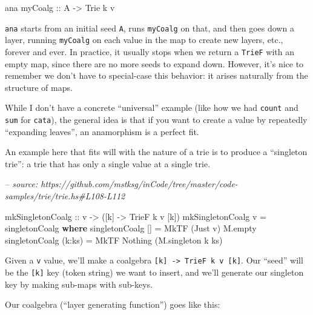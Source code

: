 \documentclass[]{article}
\newenvironment{Shaded}{}{}
\newcommand{\CommentTok}[1]{\textcolor[rgb]{0.38,0.63,0.69}{\textit{#1}}}
\newcommand{\DataTypeTok}[1]{\textcolor[rgb]{0.56,0.13,0.00}{#1}}
\newcommand{\FunctionTok}[1]{\textcolor[rgb]{0.02,0.16,0.49}{#1}}
\newcommand{\KeywordTok}[1]{\textcolor[rgb]{0.00,0.44,0.13}{\textbf{#1}}}
\newcommand{\NormalTok}[1]{#1}
\newcommand{\OtherTok}[1]{\textcolor[rgb]{0.00,0.44,0.13}{#1}}
\begin{document}
\begin{Shaded}
\begin{Highlighting}[]
\NormalTok{ana}\OtherTok{ myCoalg ::} \DataTypeTok{A} \OtherTok{->} \DataTypeTok{Trie}\NormalTok{ k v}
\end{Highlighting}
\end{Shaded}

\texttt{ana} starts from an initial seed \texttt{A}, runs \texttt{myCoalg} on
that, and then goes down a layer, running \texttt{myCoalg} on each value in the
map to create new layers, etc., forever and ever. In practice, it usually stops
when we return a \texttt{TrieF} with an empty map, since there are no more seeds
to expand down. However, it's nice to remember we don't have to special-case
this behavior: it arises naturally from the structure of maps.

While I don't have a concrete ``universal'' example (like how we had
\texttt{count} and \texttt{sum} for \texttt{cata}), the general idea is that if
you want to create a value by repeatedly ``expanding leaves'', an anamorphism is
a perfect fit.

An example here that fits will with the nature of a trie is to produce a
``singleton trie'': a trie that has only a single value at a single trie.

\begin{Shaded}
\begin{Highlighting}[]
\CommentTok{-- source: https://github.com/mstksg/inCode/tree/master/code-samples/trie/trie.hs#L108-L112}

\OtherTok{mkSingletonCoalg ::}\NormalTok{ v }\OtherTok{->}\NormalTok{ ([k] }\OtherTok{->} \DataTypeTok{TrieF}\NormalTok{ k v [k])}
\NormalTok{mkSingletonCoalg v }\FunctionTok{=}\NormalTok{ singletonCoalg}
  \KeywordTok{where}
\NormalTok{    singletonCoalg []     }\FunctionTok{=} \DataTypeTok{MkTF}\NormalTok{ (}\DataTypeTok{Just}\NormalTok{ v) M.empty}
\NormalTok{    singletonCoalg (k}\FunctionTok{:}\NormalTok{ks) }\FunctionTok{=} \DataTypeTok{MkTF} \DataTypeTok{Nothing}\NormalTok{  (M.singleton k ks)}
\end{Highlighting}
\end{Shaded}

Given a \texttt{v} value, we'll make a coalgebra
\texttt{{[}k{]}\ -\textgreater{}\ TrieF\ k\ v\ {[}k{]}}. Our ``seed'' will be
the \texttt{{[}k{]}} key (token string) we want to insert, and we'll generate
our singleton key by making sub-maps with sub-keys.

Our coalgebra (``layer generating function'') goes like this:
\end{document}
